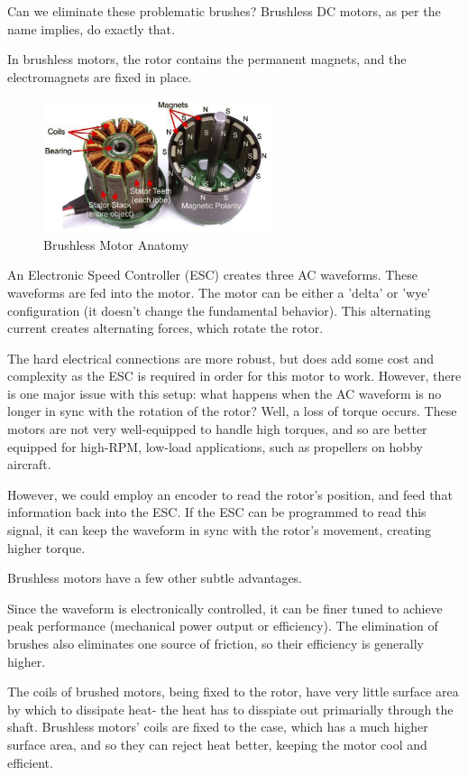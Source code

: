 \documentclass[10pt,letterpaper]{book}
\begin{document}
Can we eliminate these problematic brushes? Brushless DC motors, as per the name implies, do exactly that.

In brushless motors, the rotor contains the permanent magnets, and the electromagnets are fixed in place.
\begin{figure}[H]\centering
\includegraphics[width=0.6\textwidth]{img_Mechatronics_Motors_brushless.png}
\caption{Brushless Motor Anatomy}
\end{figure}

An Electronic Speed Controller (ESC) creates three AC waveforms. These waveforms are fed into the motor. The motor can be either a 'delta' or 'wye' configuration (it doesn't change the fundamental behavior). This alternating current creates alternating forces, which rotate the rotor.

The hard electrical connections are more robust, but does add some cost and complexity as the ESC is required in order for this motor to work. However, there is one major issue with this setup: what happens when the AC waveform is no longer in sync with the rotation of the rotor? Well, a loss of torque occurs. These motors are not very well-equipped to handle high torques, and so are better equipped for high-RPM, low-load applications, such as propellers on hobby aircraft.

However, we could employ an encoder to read the rotor's position, and feed that information back into the ESC. If the ESC can be programmed to read this signal, it can keep the waveform in sync with the rotor's movement, creating higher torque.

Brushless motors have a few other subtle advantages.

Since the waveform is electronically controlled, it can be finer tuned to achieve peak performance (mechanical power output or efficiency). The elimination of brushes also eliminates one source of friction, so their efficiency is generally higher.

The coils of brushed motors, being fixed to the rotor, have very little surface area by which to dissipate heat- the heat has to disspiate out primarially through the shaft. Brushless motors' coils are fixed to the case, which has a much higher surface area, and so they can reject heat better, keeping the motor cool and efficient.
\end{document}
